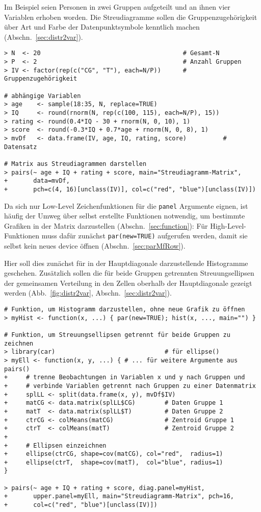 Im Beispiel seien Personen in zwei Gruppen aufgeteilt und an ihnen vier Variablen erhoben worden. Die Streudiagramme sollen die Gruppenzugehörigkeit über Art und Farbe der Datenpunktsymbole kenntlich machen (Abschn.\ \ref{sec:distr2var}).
\begin{lstlisting}
> N  <- 20                                       # Gesamt-N
> P  <- 2                                        # Anzahl Gruppen
> IV <- factor(rep(c("CG", "T"), each=N/P))      # Gruppenzugehörigkeit

# abhängige Variablen
> age    <- sample(18:35, N, replace=TRUE)
> IQ     <- round(rnorm(N, rep(c(100, 115), each=N/P), 15))
> rating <- round(0.4*IQ - 30 + rnorm(N, 0, 10), 1)
> score  <- round(-0.3*IQ + 0.7*age + rnorm(N, 0, 8), 1)
> mvDf   <- data.frame(IV, age, IQ, rating, score)          # Datensatz

# Matrix aus Streudiagrammen darstellen
> pairs(~ age + IQ + rating + score, main="Streudiagramm-Matrix",
+       data=mvDf,
+       pch=c(4, 16)[unclass(IV)], col=c("red", "blue")[unclass(IV)])
\end{lstlisting}

Da sich nur Low-Level Zeichenfunktionen für die \lstinline!panel! Argumente eignen, ist häufig der Umweg über selbst erstellte Funktionen notwendig, um bestimmte Grafiken in der Matrix darzustellen (Abschn.\ \ref{sec:function}): Für High-Level-Funktionen muss dafür zunächst \lstinline!par(new=TRUE)! aufgerufen werden, damit sie selbst kein neues device öffnen (Abschn.\ \ref{sec:parMfRow}).

Hier soll dies zunächst für in der Hauptdiagonale darzustellende Histogramme geschehen. Zusätzlich sollen die für beide Gruppen getrennten Streuungsellipsen der gemeinsamen Verteilung in den Zellen oberhalb der Hauptdiagonale gezeigt werden (Abb.\ \ref{fig:distr2var}, Abschn.\ \ref{sec:distr2var}).
\begin{lstlisting}
# Funktion, um Histogramm darzustellen, ohne neue Grafik zu öffnen
> myHist <- function(x, ...) { par(new=TRUE); hist(x, ..., main="") }

# Funktion, um Streuungsellipsen getrennt für beide Gruppen zu zeichnen
> library(car)                              # für ellipse()
> myEll <- function(x, y, ...) { # ... für weitere Argumente aus pairs()
+     # trenne Beobachtungen in Variablen x und y nach Gruppen und
+     # verbinde Variablen getrennt nach Gruppen zu einer Datenmatrix
+     splLL <- split(data.frame(x, y), mvDf$IV)
+     matCG <- data.matrix(splLL$CG)        # Daten Gruppe 1
+     matT  <- data.matrix(splLL$T)         # Daten Gruppe 2
+     ctrCG <- colMeans(matCG)              # Zentroid Gruppe 1
+     ctrT  <- colMeans(matT)               # Zentroid Gruppe 2
+
+     # Ellipsen einzeichnen
+     ellipse(ctrCG, shape=cov(matCG), col="red",  radius=1)
+     ellipse(ctrT,  shape=cov(matT),  col="blue", radius=1)
}

> pairs(~ age + IQ + rating + score, diag.panel=myHist,
+       upper.panel=myEll, main="Streudiagramm-Matrix", pch=16,
+       col=c("red", "blue")[unclass(IV)])
\end{lstlisting}

